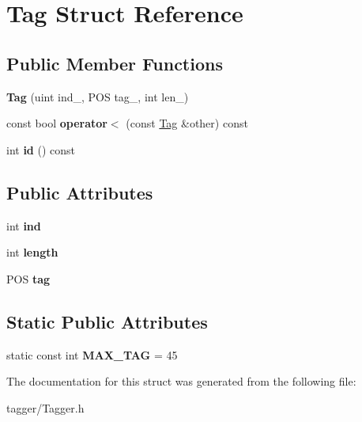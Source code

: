 \hypertarget{structTag}{
\section{Tag Struct Reference}
\label{structTag}
}
\subsection*{Public Member Functions}
\begin{DoxyCompactItemize}
\item 
\hypertarget{structTag_ab32833339e272705062ac1a5d5f1ca10}{
{\bfseries Tag} (uint ind\_\-, POS tag\_\-, int len\_\-)}
\label{structTag_ab32833339e272705062ac1a5d5f1ca10}

\item 
\hypertarget{structTag_aed3aabe09176d4a6acbb2cc7b3170228}{
const bool {\bfseries operator$<$} (const \hyperlink{structTag}{Tag} \&other) const }
\label{structTag_aed3aabe09176d4a6acbb2cc7b3170228}

\item 
\hypertarget{structTag_a5458e1229013075f4597c1dba313ce83}{
int {\bfseries id} () const }
\label{structTag_a5458e1229013075f4597c1dba313ce83}

\end{DoxyCompactItemize}
\subsection*{Public Attributes}
\begin{DoxyCompactItemize}
\item 
\hypertarget{structTag_a072cbc6c6ac82c2398ad409a5eb28b71}{
int {\bfseries ind}}
\label{structTag_a072cbc6c6ac82c2398ad409a5eb28b71}

\item 
\hypertarget{structTag_a7b67562e1a664c9fed9afb74902b0fe5}{
int {\bfseries length}}
\label{structTag_a7b67562e1a664c9fed9afb74902b0fe5}

\item 
\hypertarget{structTag_a5f97e5e57a82b467da83f2990a276e81}{
POS {\bfseries tag}}
\label{structTag_a5f97e5e57a82b467da83f2990a276e81}

\end{DoxyCompactItemize}
\subsection*{Static Public Attributes}
\begin{DoxyCompactItemize}
\item 
\hypertarget{structTag_acb96fe3a41181e0e10628ae00fe63878}{
static const int {\bfseries MAX\_\-TAG} = 45}
\label{structTag_acb96fe3a41181e0e10628ae00fe63878}

\end{DoxyCompactItemize}


The documentation for this struct was generated from the following file:\begin{DoxyCompactItemize}
\item 
tagger/Tagger.h\end{DoxyCompactItemize}
